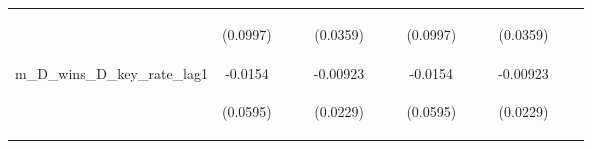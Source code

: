 \documentclass[]{article}
\begin{document}
\begin{center}
\begin{tabular}{lcccccccccccc}
\vspace{4pt} & \begin{footnotesize}(0.0997)\end{footnotesize} & \begin{footnotesize}\end{footnotesize} & \begin{footnotesize}\end{footnotesize} & \begin{footnotesize}(0.0359)\end{footnotesize} & \begin{footnotesize}\end{footnotesize} & \begin{footnotesize}\end{footnotesize} & \begin{footnotesize}(0.0997)\end{footnotesize} & \begin{footnotesize}\end{footnotesize} & \begin{footnotesize}\end{footnotesize} & \begin{footnotesize}(0.0359)\end{footnotesize} & \begin{footnotesize}\end{footnotesize} & \begin{footnotesize}\end{footnotesize} \\
m\_D\_wins\_D\_key\_rate\_lag1 & -0.0154 &  &  & -0.00923 &  &  & -0.0154 &  &  & -0.00923 &  &  \\
\vspace{4pt} & \begin{footnotesize}(0.0595)\end{footnotesize} & \begin{footnotesize}\end{footnotesize} & \begin{footnotesize}\end{footnotesize} & \begin{footnotesize}(0.0229)\end{footnotesize} & \begin{footnotesize}\end{footnotesize} & \begin{footnotesize}\end{footnotesize} & \begin{footnotesize}(0.0595)\end{footnotesize} & \begin{footnotesize}\end{footnotesize} & \begin{footnotesize}\end{footnotesize} & \begin{footnotesize}(0.0229)\end{footnotesize} & \begin{footnotesize}\end{footnotesize} & \begin{footnotesize}\end{footnotesize} \\

\end{tabular}
\end{center}
\end{document}
